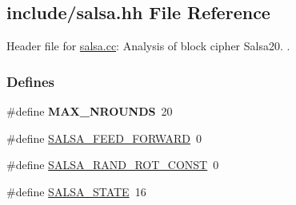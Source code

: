 \hypertarget{salsa_8hh}{\subsection{include/salsa.hh \-File \-Reference}
\label{salsa_8hh}
}


\-Header file for \hyperlink{salsa_8cc}{salsa.\-cc}\-: \-Analysis of block cipher \-Salsa20.  .  


\subsubsection*{\-Defines}
\begin{DoxyCompactItemize}
\item 
\hypertarget{salsa_8hh_ab9131406759404181baccde51c4fa855}{\#define {\bfseries \-M\-A\-X\-\_\-\-N\-R\-O\-U\-N\-D\-S}~20}\label{salsa_8hh_ab9131406759404181baccde51c4fa855}

\item 
\#define \hyperlink{salsa_8hh_a26854b2861b7c4bbddcf4833fad35882}{\-S\-A\-L\-S\-A\-\_\-\-F\-E\-E\-D\-\_\-\-F\-O\-R\-W\-A\-R\-D}~0
\item 
\#define \hyperlink{salsa_8hh_a92b29a260afbda4bbda637dd7c76cff6}{\-S\-A\-L\-S\-A\-\_\-\-R\-A\-N\-D\-\_\-\-R\-O\-T\-\_\-\-C\-O\-N\-S\-T}~0
\item 
\#define \hyperlink{salsa_8hh_a642186115ff24eb2f42febb3ccaa093f}{\-S\-A\-L\-S\-A\-\_\-\-S\-T\-A\-T\-E}~16
\end{DoxyCompactItemize}
